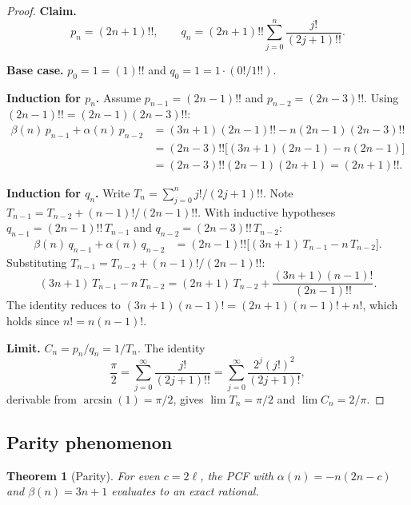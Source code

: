 \documentclass[11pt,a4paper]{article}
\theoremstyle{plain}
\newtheorem{theorem}{Theorem}[section]
\theoremstyle{definition}
\theoremstyle{remark}
\begin{document}
\begin{proof}
\textbf{Claim.}
\begin{equation}\label{eq:pi-pq}
  p_n = (2n{+}1)!!, \qquad
  q_n = (2n{+}1)!! \sum_{j=0}^{n} \frac{j!}{(2j{+}1)!!}.
\end{equation}

\textbf{Base case.}
$p_0 = 1 = (1)!!$ and $q_0 = 1 = 1\cdot(0!/1!!)$.

\medskip\noindent\textbf{Induction for $p_n$.}
Assume $p_{n-1} = (2n{-}1)!!$ and $p_{n-2} = (2n{-}3)!!$.
Using $(2n{-}1)!! = (2n{-}1)(2n{-}3)!!$:
\begin{align*}
  \beta(n)\,p_{n-1} + \alpha(n)\,p_{n-2}
  &= (3n{+}1)(2n{-}1)!! - n(2n{-}1)(2n{-}3)!! \\
  &= (2n{-}3)!!\bigl[(3n{+}1)(2n{-}1) - n(2n{-}1)\bigr] \\
  &= (2n{-}3)!!(2n{-}1)(2n{+}1) = (2n{+}1)!!.
\end{align*}

\medskip\noindent\textbf{Induction for $q_n$.}
Write $T_n = \sum_{j=0}^{n} j!/(2j{+}1)!!$.
Note $T_{n-1} = T_{n-2} + (n{-}1)!/(2n{-}1)!!$.
With inductive hypotheses
$q_{n-1} = (2n{-}1)!!\,T_{n-1}$ and $q_{n-2} = (2n{-}3)!!\,T_{n-2}$:
\begin{align*}
\beta(n)\,q_{n-1} + \alpha(n)\,q_{n-2}
&= (2n{-}1)!!\bigl[(3n{+}1)\,T_{n-1} - n\,T_{n-2}\bigr].
\end{align*}
Substituting $T_{n-1} = T_{n-2} + (n{-}1)!/(2n{-}1)!!$:
\[
  (3n{+}1)\,T_{n-1} - n\,T_{n-2}
  = (2n{+}1)\,T_{n-2} + \frac{(3n{+}1)(n{-}1)!}{(2n{-}1)!!}.
\]
The identity reduces to
$(3n{+}1)(n{-}1)! = (2n{+}1)(n{-}1)! + n!$,
which holds since $n! = n(n{-}1)!$.

\medskip\noindent\textbf{Limit.}
$C_n = p_n/q_n = 1/T_n$.
The identity~\cite[\S5.2]{cuyt2008}
\begin{equation}\label{eq:pi-id}
  \frac{\pi}{2}
  = \sum_{j=0}^{\infty} \frac{j!}{(2j{+}1)!!}
  = \sum_{j=0}^{\infty} \frac{2^j(j!)^2}{(2j{+}1)!},
\end{equation}
derivable from $\arcsin(1) = \pi/2$,
gives $\lim T_n = \pi/2$ and $\lim C_n = 2/\pi$.
\end{proof}

\subsection{Parity phenomenon}\label{sec:parity}

\begin{theorem}[Parity]\label{thm:parity}
For even $c = 2\ell$, the PCF with $\alpha(n) = -n(2n{-}c)$ and
$\beta(n) = 3n+1$ evaluates to an exact rational.
\end{theorem}
\end{document}
